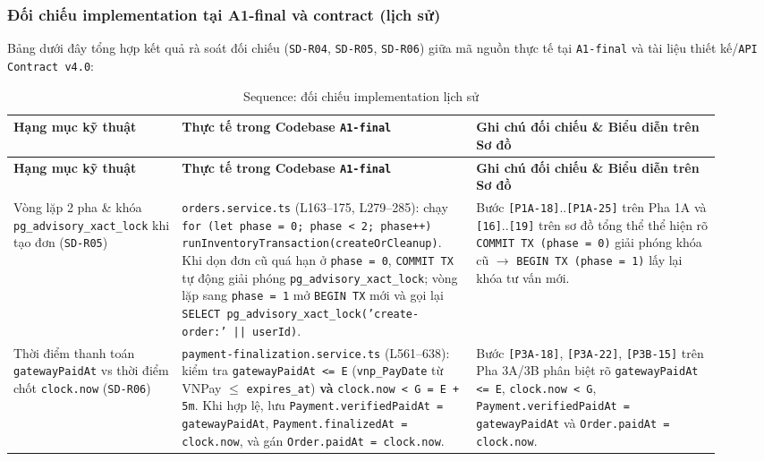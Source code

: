 \subsubsection{Đối chiếu implementation tại A1-final và contract (lịch sử)}

Bảng dưới đây tổng hợp kết quả rà soát đối chiếu (\texttt{SD-R04}, \texttt{SD-R05}, \texttt{SD-R06}) giữa mã nguồn thực tế tại \texttt{A1-final} và tài liệu thiết kế/\texttt{API Contract v4.0}:

\begingroup\small
\renewcommand{\arraystretch}{1.2}
\begin{longtable}{>{\raggedright\arraybackslash}p{0.22\linewidth}>{\raggedright\arraybackslash}p{0.38\linewidth}>{\raggedright\arraybackslash}p{0.32\linewidth}}
\caption{Sequence: đối chiếu implementation lịch sử}\\
\hline
\textbf{Hạng mục kỹ thuật} & \textbf{Thực tế trong Codebase \texttt{A1-final}} & \textbf{Ghi chú đối chiếu \& Biểu diễn trên Sơ đồ} \\ \hline
\endfirsthead
\hline
\textbf{Hạng mục kỹ thuật} & \textbf{Thực tế trong Codebase \texttt{A1-final}} & \textbf{Ghi chú đối chiếu \& Biểu diễn trên Sơ đồ} \\ \hline
\endhead
Vòng lặp 2 pha \& khóa \texttt{pg\_advisory\_xact\_lock} khi tạo đơn (\texttt{SD-R05}) & \texttt{orders.service.ts} (L163--175, L279--285): chạy \texttt{for (let phase = 0; phase < 2; phase++) runInventoryTransaction(createOrCleanup)}. Khi dọn đơn cũ quá hạn ở \texttt{phase = 0}, \texttt{COMMIT TX} tự động giải phóng \texttt{pg\_advisory\_xact\_lock}; vòng lặp sang \texttt{phase = 1} mở \texttt{BEGIN TX} mới và gọi lại \texttt{SELECT pg\_advisory\_xact\_lock('create-order:' || userId)}. & Bước \texttt{[P1A-18]}..\texttt{[P1A-25]} trên Pha 1A và \texttt{[16]}..\texttt{[19]} trên sơ đồ tổng thể thể hiện rõ \texttt{COMMIT TX (phase = 0)} giải phóng khóa cũ $\rightarrow$ \texttt{BEGIN TX (phase = 1)} lấy lại khóa tư vấn mới. \\ \hline
Thời điểm thanh toán \texttt{gatewayPaidAt} vs thời điểm chốt \texttt{clock.now} (\texttt{SD-R06}) & \texttt{payment-finalization.service.ts} (L561--638): kiểm tra \texttt{gatewayPaidAt <= E} (\texttt{vnp\_PayDate} từ VNPay $\le$ \texttt{expires\_at}) \textbf{và} \texttt{clock.now < G = E + 5m}. Khi hợp lệ, lưu \texttt{Payment.verifiedPaidAt = gatewayPaidAt}, \texttt{Payment.finalizedAt = clock.now}, và gán \texttt{Order.paidAt = clock.now}. & Bước \texttt{[P3A-18]}, \texttt{[P3A-22]}, \texttt{[P3B-15]} trên Pha 3A/3B phân biệt rõ \texttt{gatewayPaidAt <= E}, \texttt{clock.now < G}, \texttt{Payment.verifiedPaidAt = gatewayPaidAt} và \texttt{Order.paidAt = clock.now}. \\ \hline

\end{longtable}
